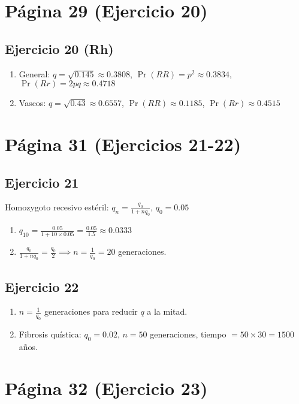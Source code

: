 \documentclass{article}
\begin{document}
	\section*{Página 29 (Ejercicio 20)}
	
	\subsection*{Ejercicio 20 (Rh)}
	\begin{enumerate}[label=\alph*)]
		\item General: \( q = \sqrt{0.145} \approx 0.3808 \), \( \Pr(RR) = p^2 \approx 0.3834 \), \( \Pr(Rr) = 2pq \approx 0.4718 \)
		\item Vascos: \( q = \sqrt{0.43} \approx 0.6557 \), \( \Pr(RR) \approx 0.1185 \), \( \Pr(Rr) \approx 0.4515 \)
	\end{enumerate}
	
	\section*{Página 31 (Ejercicios 21-22)}
	
	\subsection*{Ejercicio 21}
	Homozygoto recesivo estéril: \( q_n = \frac{q_0}{1 + n q_0} \), \( q_0 = 0.05 \)
	\begin{enumerate}[label=\alph*)]
		\item \( q_{10} = \frac{0.05}{1 + 10 \times 0.05} = \frac{0.05}{1.5} \approx 0.0333 \)
		\item \( \frac{q_0}{1 + n q_0} = \frac{q_0}{2} \implies n = \frac{1}{q_0} = 20 \) generaciones.
	\end{enumerate}
	
	\subsection*{Ejercicio 22}
	\begin{enumerate}[label=\alph*)]
		\item \( n = \frac{1}{q_0} \) generaciones para reducir \( q \) a la mitad.
		\item Fibrosis quística: \( q_0 = 0.02 \), \( n = 50 \) generaciones, tiempo \( = 50 \times 30 = 1500 \) años.
	\end{enumerate}
	
	\section*{Página 32 (Ejercicio 23)}
	
\end{document}
